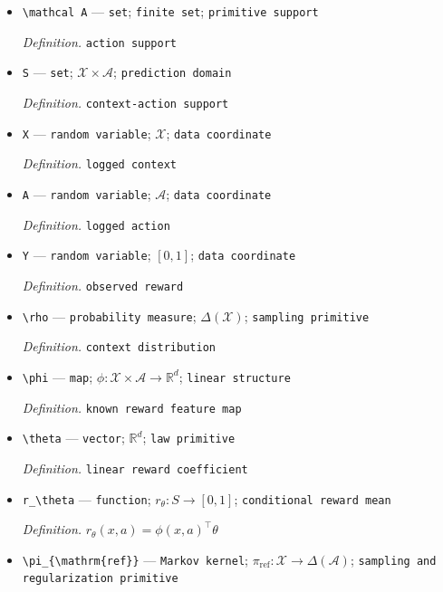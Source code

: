 \documentclass{article}
\begin{document}
\begin{itemize}
  \item \texttt{\textbackslash{}\allowbreak{}mathcal A} --- \texttt{set}; \texttt{finite set}; \texttt{primitive support}
  \par\smallskip\noindent\emph{Definition.} \texttt{action support}
  \item \texttt{S} --- \texttt{set}; \(\mathcal X\times\mathcal A\); \texttt{prediction domain}
  \par\smallskip\noindent\emph{Definition.} \texttt{context-\allowbreak{}action support}
  \item \texttt{X} --- \texttt{random variable}; \(\mathcal X\); \texttt{data coordinate}
  \par\smallskip\noindent\emph{Definition.} \texttt{logged context}
  \item \texttt{A} --- \texttt{random variable}; \(\mathcal A\); \texttt{data coordinate}
  \par\smallskip\noindent\emph{Definition.} \texttt{logged action}
  \item \texttt{Y} --- \texttt{random variable}; \([0,1]\); \texttt{data coordinate}
  \par\smallskip\noindent\emph{Definition.} \texttt{observed reward}
  \item \texttt{\textbackslash{}\allowbreak{}rho} --- \texttt{probability measure}; \(\Delta(\mathcal X)\); \texttt{sampling primitive}
  \par\smallskip\noindent\emph{Definition.} \texttt{context distribution}
  \item \texttt{\textbackslash{}\allowbreak{}phi} --- \texttt{map}; \(\phi:\mathcal X\times\mathcal A\to\mathbb R^d\); \texttt{linear structure}
  \par\smallskip\noindent\emph{Definition.} \texttt{known reward feature map}
  \item \texttt{\textbackslash{}\allowbreak{}theta} --- \texttt{vector}; \(\mathbb R^d\); \texttt{law primitive}
  \par\smallskip\noindent\emph{Definition.} \texttt{linear reward coefficient}
  \item \texttt{r\_\allowbreak{}\textbackslash{}\allowbreak{}theta} --- \texttt{function}; \(r_\theta:S\to[0,1]\); \texttt{conditional reward mean}
  \par\smallskip\noindent\emph{Definition.} \(r_\theta(x,a)=\phi(x,a)^\top\theta\)
  \item \texttt{\textbackslash{}\allowbreak{}pi\_\allowbreak{}\{\textbackslash{}\allowbreak{}mathrm\{ref\}\allowbreak{}\}\allowbreak{}} --- \texttt{Markov kernel}; \(\pi_{\mathrm{ref}}:\mathcal X\to\Delta(\mathcal A)\); \texttt{sampling and regularization primitive}

\end{itemize}
\end{document}
